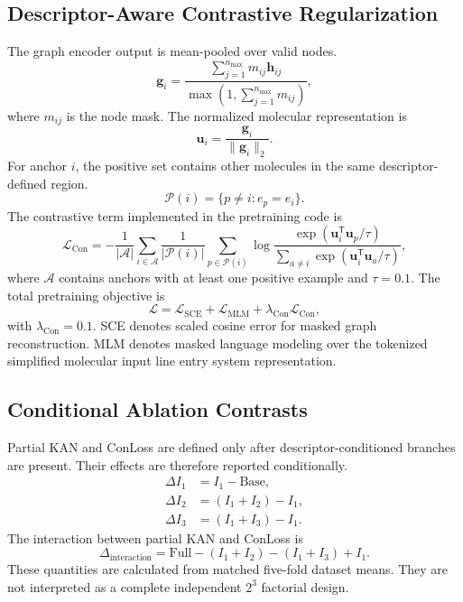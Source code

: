 \documentclass[journal=jcisd8,manuscript=article]{achemso}
\begin{document}
\subsection{Descriptor-Aware Contrastive Regularization}

The graph encoder output is mean-pooled over valid nodes.
\begin{equation}
\mathbf{g}_i
=
\frac{\sum_{j=1}^{n_{\max}}m_{ij}\mathbf{h}_{ij}}
{\max\left(1,\sum_{j=1}^{n_{\max}}m_{ij}\right)},
\end{equation}
where \(m_{ij}\) is the node mask. The normalized molecular representation is
\begin{equation}
\mathbf{u}_i=\frac{\mathbf{g}_i}{\lVert\mathbf{g}_i\rVert_2}.
\end{equation}
For anchor \(i\), the positive set contains other molecules in the same
descriptor-defined region.
\begin{equation}
\mathcal{P}(i)=\{p\neq i:e_p=e_i\}.
\end{equation}
The contrastive term implemented in the pretraining code is
\begin{equation}
\mathcal{L}_{\mathrm{Con}}
=
-\frac{1}{|\mathcal{A}|}
\sum_{i\in\mathcal{A}}
\frac{1}{|\mathcal{P}(i)|}
\sum_{p\in\mathcal{P}(i)}
\log
\frac{
\exp\left(\mathbf{u}_i^{\mathsf{T}}\mathbf{u}_p/\tau\right)
}{
\sum_{a\neq i}
\exp\left(\mathbf{u}_i^{\mathsf{T}}\mathbf{u}_a/\tau\right)
},
\label{eq:conloss}
\end{equation}
where \(\mathcal{A}\) contains anchors with at least one positive example and
\(\tau=0.1\). The total pretraining objective is
\begin{equation}
\mathcal{L}
=
\mathcal{L}_{\mathrm{SCE}}
+
\mathcal{L}_{\mathrm{MLM}}
+
\lambda_{\mathrm{Con}}\mathcal{L}_{\mathrm{Con}},
\end{equation}
with \(\lambda_{\mathrm{Con}}=0.1\). SCE denotes scaled cosine error for masked
graph reconstruction. MLM denotes masked language modeling over the tokenized
simplified molecular input line entry system representation.

\subsection{Conditional Ablation Contrasts}

Partial KAN and ConLoss are defined only after descriptor-conditioned
branches are present. Their effects are therefore reported conditionally.
\begin{align}
\Delta I_1 &= I_1-\mathrm{Base},\\
\Delta I_2 &= (I_1+I_2)-I_1,\\
\Delta I_3 &= (I_1+I_3)-I_1.
\end{align}
The interaction between partial KAN and ConLoss is
\begin{equation}
\Delta_{\mathrm{interaction}}
=
\mathrm{Full}
-(I_1+I_2)
-(I_1+I_3)
+I_1.
\end{equation}
These quantities are calculated from matched five-fold dataset means. They
are not interpreted as a complete independent \(2^3\) factorial design.
\end{document}

